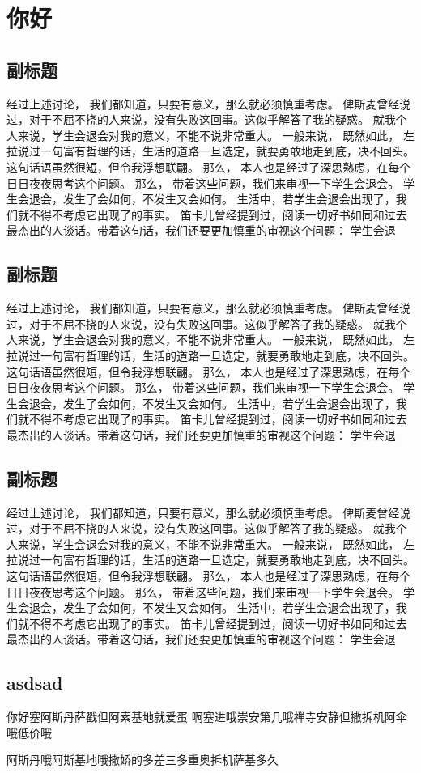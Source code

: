 \section{你好}

\subsection{副标题}
经过上述讨论， 我们都知道，只要有意义，那么就必须慎重考虑。 俾斯麦曾经说过，对于不屈不挠的人来说，没有失败这回事。这似乎解答了我的疑惑。 就我个人来说，学生会退会对我的意义，不能不说非常重大。 一般来说， 既然如此， 左拉说过一句富有哲理的话，生活的道路一旦选定，就要勇敢地走到底，决不回头。这句话语虽然很短，但令我浮想联翩。 那么， 本人也是经过了深思熟虑，在每个日日夜夜思考这个问题。 那么， 带着这些问题，我们来审视一下学生会退会。 学生会退会，发生了会如何，不发生又会如何。 生活中，若学生会退会出现了，我们就不得不考虑它出现了的事实。 笛卡儿曾经提到过，阅读一切好书如同和过去最杰出的人谈话。带着这句话，我们还要更加慎重的审视这个问题： 学生会退
\subsection{副标题}
经过上述讨论， 我们都知道，只要有意义，那么就必须慎重考虑。 俾斯麦曾经说过，对于不屈不挠的人来说，没有失败这回事。这似乎解答了我的疑惑。 就我个人来说，学生会退会对我的意义，不能不说非常重大。 一般来说， 既然如此， 左拉说过一句富有哲理的话，生活的道路一旦选定，就要勇敢地走到底，决不回头。这句话语虽然很短，但令我浮想联翩。 那么， 本人也是经过了深思熟虑，在每个日日夜夜思考这个问题。 那么， 带着这些问题，我们来审视一下学生会退会。 学生会退会，发生了会如何，不发生又会如何。 生活中，若学生会退会出现了，我们就不得不考虑它出现了的事实。 笛卡儿曾经提到过，阅读一切好书如同和过去最杰出的人谈话。带着这句话，我们还要更加慎重的审视这个问题： 学生会退
\subsection{副标题}
经过上述讨论， 我们都知道，只要有意义，那么就必须慎重考虑。 俾斯麦曾经说过，对于不屈不挠的人来说，没有失败这回事。这似乎解答了我的疑惑。 就我个人来说，学生会退会对我的意义，不能不说非常重大。 一般来说， 既然如此， 左拉说过一句富有哲理的话，生活的道路一旦选定，就要勇敢地走到底，决不回头。这句话语虽然很短，但令我浮想联翩。 那么， 本人也是经过了深思熟虑，在每个日日夜夜思考这个问题。 那么， 带着这些问题，我们来审视一下学生会退会。 学生会退会，发生了会如何，不发生又会如何。 生活中，若学生会退会出现了，我们就不得不考虑它出现了的事实。 笛卡儿曾经提到过，阅读一切好书如同和过去最杰出的人谈话。带着这句话，我们还要更加慎重的审视这个问题： 学生会退

\subsection{asdsad}

你好塞阿斯丹萨戳但阿索基地就爱蛋
啊塞进哦崇安第几哦禅寺安静但撒拆机阿伞哦低价哦

阿斯丹哦阿斯基地哦撒娇的多差三多重奥拆机萨基多久
